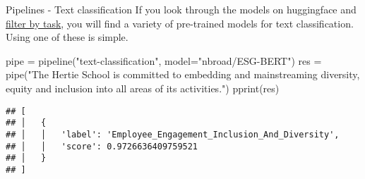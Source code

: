 \documentclass[
  10pt,
  ignorenonframetext,
  aspectratio=169]{beamer}
\newenvironment{Shaded}{\begin{snugshade}}{\end{snugshade}}
\newcommand{\NormalTok}[1]{\textcolor[rgb]{0.80,0.80,0.80}{#1}}
\newcommand{\OperatorTok}[1]{\textcolor[rgb]{0.94,0.94,0.82}{#1}}
\newcommand{\StringTok}[1]{\textcolor[rgb]{0.80,0.58,0.58}{#1}}
\begin{document}
\begin{frame}[fragile]{Pipelines - Text classification}
\protect\hypertarget{pipelines---text-classification}{}
If you look through the models on huggingface and
\href{https://huggingface.co/models?pipeline_tag=text-classification\&p=1\&sort=downloads}{filter
by task}, you will find a variety of pre-trained models for text
classification. Using one of these is simple.

\medskip
\scriptsize

\begin{Shaded}
\begin{Highlighting}[]
\NormalTok{pipe }\OperatorTok{=}\NormalTok{ pipeline(}\StringTok{"text{-}classification"}\NormalTok{, model}\OperatorTok{=}\StringTok{"nbroad/ESG{-}BERT"}\NormalTok{)}
\NormalTok{res }\OperatorTok{=}\NormalTok{ pipe(}\StringTok{"The Hertie School is committed to embedding and mainstreaming diversity, equity and inclusion into all areas of its activities."}\NormalTok{)}
\NormalTok{pprint(res)}
\end{Highlighting}
\end{Shaded}

\begin{verbatim}
## [
## │   {
## │   │   'label': 'Employee_Engagement_Inclusion_And_Diversity',
## │   │   'score': 0.9726636409759521
## │   }
## ]
\end{verbatim}
\end{frame}
\end{document}
